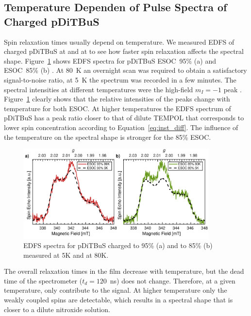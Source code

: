 \subsection{Temperature Dependen of Pulse Spectra of Charged pDiTBuS}
Spin relaxation times usually depend on temperature. We measured EDFS of charged pDiTBuS at  and at  to see how faster spin relaxation affects the spectral shape. Figure~\ref{fig:Figure_6} shows EDFS spectra for pDiTBuS  ESOC~95\% (a) and  ESOC~85\% (b) . At 80~K an overnight scan was required to obtain a satisfactory signal-to-noise ratio,  at 5~K the spectrum was recorded in a few minutes. The spectral intensities at different temperatures were   the high-field $m_I=-1$ peak . Figure~\ref{fig:Figure_6} clearly shows that the relative intensities of the peaks change with temperature for both ESOC. At higher temperatures the EDFS spectrum of pDiTBuS has a peak ratio closer to that of dilute TEMPOL that corresponds to  lower spin concentration\ik{,} according to Equation~\ref{eq:inst_diff}. The influence of the temperature  on the spectral shape is stronger for the  85\% ESOC.

\begin{figure}[ht]
\center
	\includegraphics[width=0.9\textwidth]{./pulse/figures/Figure_6.pdf}
	\caption{EDFS spectra for pDiTBuS charged to 95\% (a) and to 85\% (b) measured at 5K and at 80K.}
	\label{fig:Figure_6}
\end{figure}


The overall relaxation times in the film decrease with  temperature, but the dead time of the spectrometer ($t_d=120$~ns) does not change. Therefore, at a given temperature, only  contribute to the signal. At higher temperature only the weakly coupled spins  are detectable, which results in a spectral shape that is closer to a dilute nitroxide solution.\\




